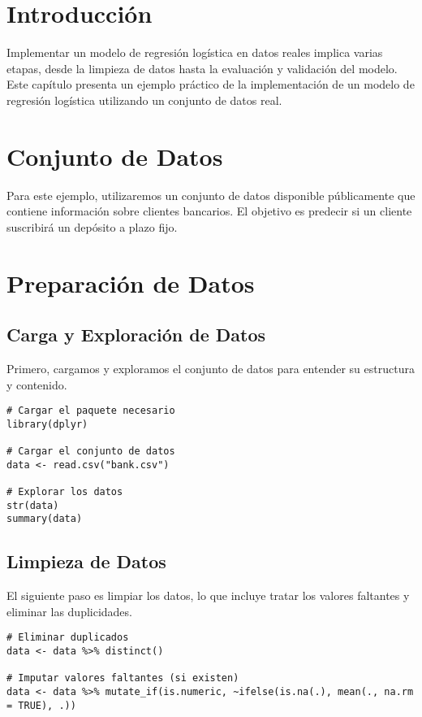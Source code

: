 \documentclass[a4paper]{report} %
\begin{document}
\section{Introducci\'on}

Implementar un modelo de regresi\'on log\'istica en datos reales implica varias etapas, desde la limpieza de datos hasta la evaluaci\'on y validaci\'on del modelo. Este cap\'itulo presenta un ejemplo pr\'actico de la implementaci\'on de un modelo de regresi\'on log\'istica utilizando un conjunto de datos real.

\section{Conjunto de Datos}

Para este ejemplo, utilizaremos un conjunto de datos disponible p\'ublicamente que contiene informaci\'on sobre clientes bancarios. El objetivo es predecir si un cliente suscribir\'a un dep\'osito a plazo fijo.

\section{Preparaci\'on de Datos}

\subsection{Carga y Exploraci\'on de Datos}

Primero, cargamos y exploramos el conjunto de datos para entender su estructura y contenido.

\begin{verbatim}
# Cargar el paquete necesario
library(dplyr)

# Cargar el conjunto de datos
data <- read.csv("bank.csv")

# Explorar los datos
str(data)
summary(data)
\end{verbatim}

\subsection{Limpieza de Datos}

El siguiente paso es limpiar los datos, lo que incluye tratar los valores faltantes y eliminar las duplicidades.

\begin{verbatim}
# Eliminar duplicados
data <- data %>% distinct()

# Imputar valores faltantes (si existen)
data <- data %>% mutate_if(is.numeric, ~ifelse(is.na(.), mean(., na.rm = TRUE), .))
\end{verbatim}
\end{document}
